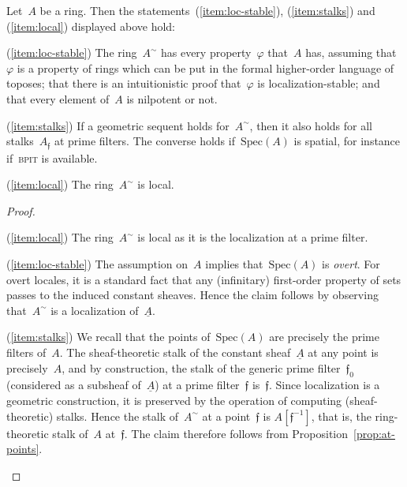 \documentclass{ws-rv9x6}
\newcommand{\fff}{\mathfrak{f}}
\newcommand{\Spec}{\mathrm{Spec}}
\renewcommand{\_}{\mathpunct{.}}
\newcommand{\?}{\,{:}\,}
\newcommand{\BPIT}{\textsc{bpit}\xspace}
\begin{document}
\begin{proposition}\label{prop:immediate-consequences}
Let~$A$ be a ring. Then the statements~(\ref{item:loc-stable}), (\ref{item:stalks}) and
(\ref{item:local}) displayed above hold:
\begin{Alphlist}[(D)]
\item[(\ref{item:loc-stable})]
The ring~$A^\sim$ has every property~$\varphi$ that~$A$ has, assuming
that~$\varphi$ is a property of rings which can be put in the formal
higher-order language of toposes; that there is an intuitionistic proof
that~$\varphi$ is localization-stable; and that every element of~$A$ is
nilpotent or not.
\item[(\ref{item:stalks})]
If a geometric sequent holds for~$A^\sim$, then it also holds for all
stalks~$A_\fff$ at prime filters. The converse holds if~$\Spec(A)$ is spatial,
for instance if~\BPIT is available.
\item[(\ref{item:local})] The ring~$A^\sim$ is local.
\end{Alphlist}
\end{proposition}

\begin{proof}
\begin{Alphlist}[(D)]
\item[(\ref{item:local})] The ring~$A^\sim$ is local as it is the
localization at a prime filter.
\item[(\ref{item:loc-stable})] The assumption on~$A$ implies that~$\Spec(A)$ is
\emph{overt}. For overt locales, it is a standard fact that any (infinitary)
first-order property of sets passes to the induced constant sheaves. Hence the
claim follows by observing that~$A^\sim$ is a localization of~$\underline{A}$.
\item[(\ref{item:stalks})] We recall that the points of~$\Spec(A)$ are
precisely the prime filters of~$A$. The sheaf-theoretic stalk of the constant
sheaf~$\underline{A}$ at any point is precisely~$A$, and by construction, the
stalk of the generic prime filter~$\fff_0$ (considered as a subsheaf
of~$\underline{A}$) at a prime filter~$\fff$ is~$\fff$. Since localization is a
geometric construction, it is preserved by the operation of computing
(sheaf-theoretic) stalks. Hence the stalk of~$A^\sim$ at a point~$\fff$ is
$A[\fff^{-1}]$, that is, the ring-theoretic stalk of~$A$ at~$\fff$. The claim
therefore follows from Proposition~\ref{prop:at-points}.\qedhere
\end{Alphlist}
\end{proof}
\end{document}
